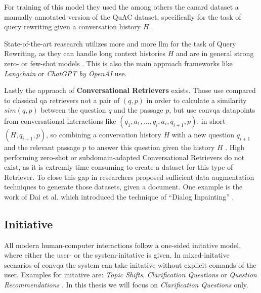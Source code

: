 For training of this model they used the among others the canard dataset \cite{elgohary_can_2019} a manually annotated version of the QuAC dataset, specifically for the task of query rewriting given a conversation history $H$.

State-of-the-art reasearch utilizes more and more \gls{llm} for the task of Query Rewriting, as they can handle long context histories $H$ and are in general strong zero- or few-shot models \cite{mao_large_2023}. This is also the main approach frameworks like \textit{Langchain} \cite{noauthor_question_nodate} or \textit{ChatGPT by OpenAI} \cite{noauthor_chatgpt_2023} use. 


Lastly the appraoch of \textbf{Conversational Retrievers} exists. Those use compared to classical \gls{qa} retrievers not a pair of $(q,p)$ in order to calculate a similarity $sim(q,p)$ between the question $q$ and the passage $p$, but use \gls{convqa} datapoints from conversational interactions like $(q_1, a_1, \dots, q_i, a_i, q_{i+1}, p)$, in short $(H, q_{i+1}, p)$, so combining a conversation history $H$ with a new question $q_{i+1}$ and the relevant passage $p$ to answer this question given the history $H$ \cite{gao_neural_2022,dai_dialog_2022}. High performing zero-shot or subdomain-adapted Conversational Retrievers do not exist, as it is extremly time consuming to create a dataset for this type of Retriever. To close this gap in researchers proposed sufficient data augmentation techniques to generate those datasets, given a document. One example is the work of Dai et al. \cite{dai_dialog_2022} which introduced the technique of \enquote{Dialog Inpainting} \cite{dai_dialog_2022}.  

\subsection{Initiative}
\label{subsec:cqa_initiative}

All modern human-computer interactions follow a one-sided initative model, where either the user- or the system-initative is given. In mixed-initative scenarios of \gls{convqa} the system can take initative without explicit comands of the user. Examples for initative are: \textit{Topic Shifts}, \textit{Clarification Questions} or \textit{Question Recommendations} \cite{zamani_conversational_2023}. In this thesis we will focus on \textit{Clarification Questions} only.

